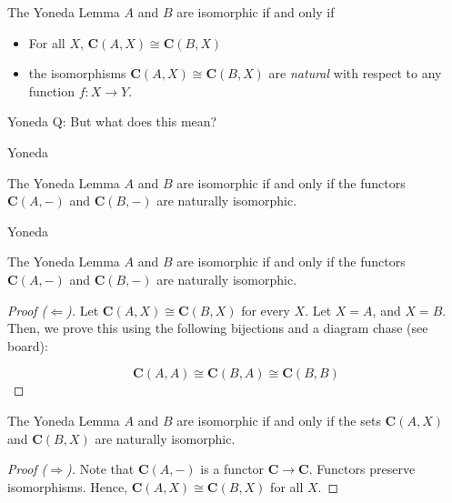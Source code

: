 \documentclass[tikz]{beamer}
\theoremstyle{definition}
\begin{document}
\begin{frame}
\begin{block}{The Yoneda Lemma}
    $A$ and $B$ are isomorphic if and only if
    \begin{itemize}
        \item For all $X$, $\mathbf{C}(A, X) \cong \mathbf{C}(B, X)$

        \item the isomorphisms $\mathbf{C}(A, X) \cong \mathbf{C}(B, X)$ are \textit{natural} with respect to any function $f : X \to Y$.
    \end{itemize}
\end{block}{}



\end{frame}
\begin{frame}{Yoneda}
    Q: But what does this mean?

\end{frame}
\begin{frame}{Yoneda}
    \begin{block}{The Yoneda Lemma}
        $A$ and $B$ are isomorphic if and only if the functors $\mathbf{C}(A, -) $ and $\mathbf{C}(B, -)$ are naturally isomorphic.
    \end{block}{}
\end{frame}

\begin{frame}{Yoneda}
    \begin{block}{The Yoneda Lemma}
        $A$ and $B$ are isomorphic if and only if the functors $\mathbf{C}(A, -) $ and $\mathbf{C}(B, -)$ are naturally isomorphic.
    \end{block}{}

    \begin{proof}[Proof ($\Leftarrow$)]

        Let $\mathbf{C}(A, X) \cong \mathbf{C}(B, X)$ for every $X$. Let $X = A$, and $X = B$. Then, we prove this using the following bijections and a diagram chase (see board):

        \begin{equation*}
            \mathbf{C}(A, A) \cong \mathbf{C}(B, A) \cong \mathbf{C}(B, B)
        \end{equation*}{}
    \end{proof}
\end{frame}

\begin{frame}[fragile]
    \begin{block}{The Yoneda Lemma}
        $A$ and $B$ are isomorphic if and only if the sets $\mathbf{C}(A, X) $ and $\mathbf{C}(B, X)$ are naturally isomorphic.
    \end{block}{}

    \begin{proof}[Proof ($\Rightarrow$)]

        Note that $\mathbf{C}(A,-)$ is a functor $\mathbf{C} \to \mathbf{C}$. Functors preserve isomorphisms. Hence, $\mathbf{C}(A, X) \cong \mathbf{C}(B, X)$ for all $X$.

    \end{proof}
\end{frame}
\end{document}
